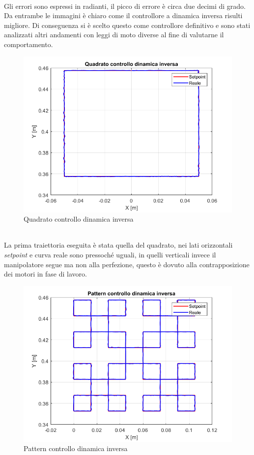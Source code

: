 \\Gli errori sono espressi in radianti, il picco di errore è circa due decimi di grado. Da entrambe le immagini è chiaro come il controllore a dinamica inversa risulti migliore. Di conseguenza si è scelto questo come controllore definitivo e sono stati analizzati altri andamenti con leggi di moto diverse al fine di valutarne il comportamento.
\begin{figure}[ht]
	\begin{center}
		\includegraphics[scale=0.46]{Immagini/Traiettorie/QuadratoDinamicaInversa}
		\caption{Quadrato controllo dinamica inversa}
		\label{fig:quadID}
	\end{center}
\end{figure}
\\La prima traiettoria eseguita è stata quella del quadrato, nei lati orizzontali \textit{setpoint} e curva reale sono pressoché uguali, in quelli verticali invece il manipolatore segue ma non alla perfezione, questo è dovuto alla contrapposizione dei motori in fase di lavoro. 
\begin{figure}[ht]
	\begin{center}
		\includegraphics[scale=0.45]{Immagini/Traiettorie/PatternDinamicaInversa}
		\caption{Pattern controllo dinamica inversa}
		\label{fig:patternID}
	\end{center}
\end{figure}

